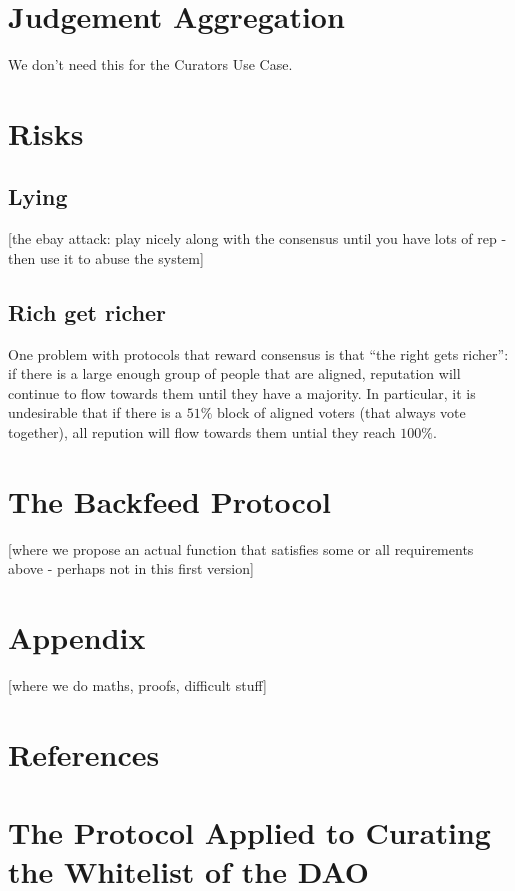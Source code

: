 \documentclass{article}
\begin{document}
\section{Judgement Aggregation}
We don't need this for the Curators Use Case.

\section{Risks}

\subsection{Lying}

[the ebay attack: play nicely along with the consensus until you have lots of rep - then use it to abuse the system]

\subsection{Rich get richer}

One problem with protocols that reward consensus is that ``the right gets richer'': if there is a large enough group of people that are aligned, reputation will continue to flow towards them until they have a majority. In particular, it is undesirable that if there is a $51\%$ block of aligned voters (that always vote together), all repution will flow towards them untial they reach $100\%$.

\section{The Backfeed Protocol}

[where we propose an actual function that satisfies some or all requirements above - perhaps not in this first version]

\section{Appendix}
[where we do  maths, proofs, difficult stuff]

\section{References}

\section{The Protocol Applied to Curating the Whitelist of the DAO}
\end{document}
